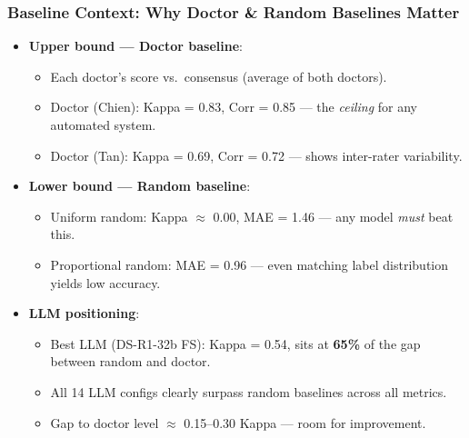 \documentclass[aspectratio=169]{beamer}
\begin{document}
\begin{frame}
    \frametitle{Baseline Context: Why Doctor \& Random Baselines Matter}
    \begin{itemize}
        \item \textbf{Upper bound --- Doctor baseline}:
        \begin{itemize}
            \item Each doctor's score vs.\ consensus (average of both doctors).
            \item Doctor (Chien): Kappa = 0.83, Corr = 0.85 --- the \emph{ceiling} for any automated system.
            \item Doctor (Tan): Kappa = 0.69, Corr = 0.72 --- shows inter-rater variability.
        \end{itemize}
        \item \textbf{Lower bound --- Random baseline}:
        \begin{itemize}
            \item Uniform random: Kappa $\approx$ 0.00, MAE = 1.46 --- any model \emph{must} beat this.
            \item Proportional random: MAE = 0.96 --- even matching label distribution yields low accuracy.
        \end{itemize}
        \item \textbf{LLM positioning}:
        \begin{itemize}
            \item Best LLM (DS-R1-32b FS): Kappa = 0.54, sits at \textbf{65\%} of the gap between random and doctor.
            \item All 14 LLM configs clearly surpass random baselines across all metrics.
            \item Gap to doctor level $\approx$ 0.15--0.30 Kappa --- room for improvement.
        \end{itemize}
    \end{itemize}
\end{frame}
\end{document}

